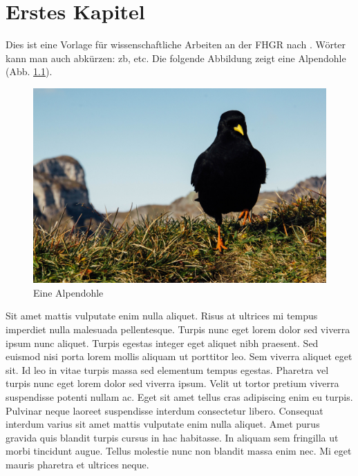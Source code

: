 \chapter{Erstes Kapitel}
Dies ist eine Vorlage für wissenschaftliche Arbeiten an der FHGR nach \cite{selina_leitfaden_nodate}. Wörter kann man auch abkürzen: \ac{zb}, \ac{etc}. Die folgende Abbildung zeigt eine Alpendohle (Abb. \ref{fig:alpendohle}).

\begin{figure}[h]
    \includegraphics[width=\textwidth]{content/00_assets/alpendohle.jpg}
    \caption{Eine Alpendohle \citep{diani_black_2016}}
    \label{fig:alpendohle}
\end{figure}

Sit amet mattis vulputate enim nulla aliquet. Risus at ultrices mi tempus imperdiet nulla malesuada pellentesque. Turpis nunc eget lorem dolor sed viverra ipsum nunc aliquet. Turpis egestas integer eget aliquet nibh praesent. Sed euismod nisi porta lorem mollis aliquam ut porttitor leo. Sem viverra aliquet eget sit. Id leo in vitae turpis massa sed elementum tempus egestas. Pharetra vel turpis nunc eget lorem dolor sed viverra ipsum. Velit ut tortor pretium viverra suspendisse potenti nullam ac. Eget sit amet tellus cras adipiscing enim eu turpis. Pulvinar neque laoreet suspendisse interdum consectetur libero. Consequat interdum varius sit amet mattis vulputate enim nulla aliquet. Amet purus gravida quis blandit turpis cursus in hac habitasse. In aliquam sem fringilla ut morbi tincidunt augue. Tellus molestie nunc non blandit massa enim nec. Mi eget mauris pharetra et ultrices neque.

